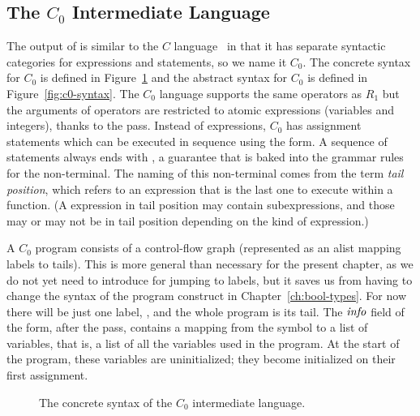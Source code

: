 \documentclass[11pt]{book}
\begin{document}
\subsection{The $C_0$ Intermediate Language}

The output of  is similar to the $C$
language~\citep{Kernighan:1988nx} in that it has separate syntactic
categories for expressions and statements, so we name it $C_0$.  The
concrete syntax for $C_0$ is defined in
Figure~\ref{fig:c0-concrete-syntax} and the abstract syntax for $C_0$
is defined in Figure~\ref{fig:c0-syntax}.
%
The $C_0$ language supports the same operators as $R_1$ but the
arguments of operators are restricted to atomic expressions (variables
and integers), thanks to the  pass. Instead
of  expressions, $C_0$ has assignment statements which can be
executed in sequence using the  form. A sequence of
statements always ends with , a guarantee that is baked
into the grammar rules for the  non-terminal. The naming of
this non-terminal comes from the term \emph{tail position}, which
refers to an expression that is the last one to execute within a
function. (A expression in tail position may contain subexpressions,
and those may or may not be in tail position depending on the kind of
expression.)

A $C_0$ program consists of a control-flow graph (represented as an
alist mapping labels to tails). This is more general than
necessary for the present chapter, as we do not yet need to introduce
 for jumping to labels, but it saves us from having to
change the syntax of the program construct in
Chapter~\ref{ch:bool-types}.  For now there will be just one label,
, and the whole program is its tail.
%
The $\mathit{info}$ field of the  form, after the
 pass, contains a mapping from the symbol
 to a list of variables, that is, a list of all the
variables used in the program. At the start of the program, these
variables are uninitialized; they become initialized on their first
assignment.

\begin{figure}[tbp]
\caption{The concrete syntax of the $C_0$ intermediate language.}
\label{fig:c0-concrete-syntax}
\end{figure}
\end{document}
